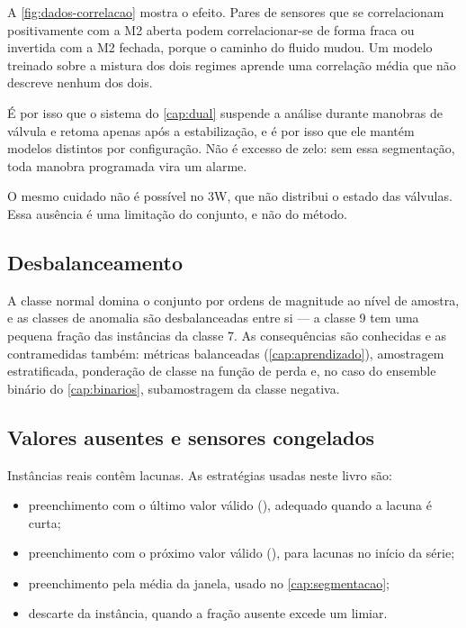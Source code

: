 A \cref{fig:dados-correlacao} mostra o efeito. Pares de sensores que se correlacionam
positivamente com a M2 aberta podem correlacionar-se de forma fraca ou invertida com a
M2 fechada, porque o caminho do fluido mudou. Um modelo treinado sobre a mistura dos dois
regimes aprende uma correlação média que não descreve nenhum dos dois.

\begin{destaque}
É por isso que o sistema do \cref{cap:dual} suspende a análise durante manobras de
válvula e retoma apenas após a estabilização, e é por isso que ele mantém modelos
distintos por configuração. Não é excesso de zelo: sem essa segmentação, toda manobra
programada vira um alarme.

O mesmo cuidado não é possível no 3W, que não distribui o estado das válvulas. Essa
ausência é uma limitação do conjunto, e não do método.
\end{destaque}

\subsection{Desbalanceamento}

A classe normal domina o conjunto por ordens de magnitude ao nível de amostra, e as
classes de anomalia são desbalanceadas entre si --- a classe 9 tem uma pequena fração
das instâncias da classe 7. As consequências são conhecidas e as contramedidas também:
métricas balanceadas (\cref{cap:aprendizado}), amostragem estratificada, ponderação de
classe na função de perda e, no caso do ensemble binário do \cref{cap:binarios},
subamostragem da classe negativa.

\subsection{Valores ausentes e sensores congelados}

Instâncias reais contêm lacunas. As estratégias usadas neste livro são:

\begin{itemize}[leftmargin=*,itemsep=0.3em]
  \item preenchimento com o último valor válido (), adequado quando a
        lacuna é curta;
  \item preenchimento com o próximo valor válido (), para lacunas no
        início da série;
  \item preenchimento pela média da janela, usado no \cref{cap:segmentacao};
  \item descarte da instância, quando a fração ausente excede um limiar.
\end{itemize}

